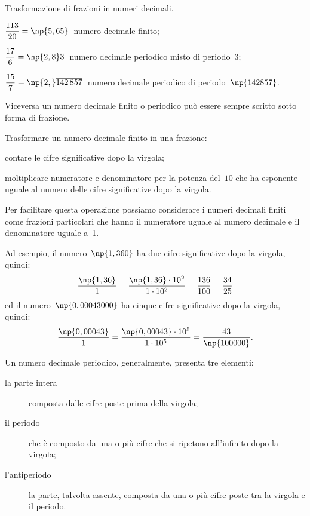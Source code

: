 \begin{exrig}
 \begin{esempio}
 Trasformazione di frazioni in numeri decimali.
  \begin{center}
  	
  \end{center}	
  \begin{enumeratea}
  \item $\dfrac{113}{20}=\np{5,65}\:$ numero decimale finito;\vspace{1.03ex}
  \item $\dfrac{17}{6}=\np{2,8}\overline{3}\:$ numero decimale periodico misto di periodo~3;\vspace{1.03ex}
  \item $\dfrac{15}{7}=\np{2,}\overline{142\,857}\:$ numero decimale periodico di periodo~$\np{142857}$.
  \end{enumeratea}
 \end{esempio}
\end{exrig}


\ovalbox{\risolvi \ref{ese:3.24}, \ref{ese:3.25}, \ref{ese:3.26}}\vspazio

Viceversa un numero decimale finito o periodico può essere sempre scritto sotto forma di frazione.

\begin{procedura}
	Trasformare un numero decimale finito in una frazione:
\begin{enumeratea}
 \item contare le cifre significative dopo la virgola;
 \item moltiplicare numeratore e denominatore per la potenza del~$10$ che ha esponente uguale al
	 numero delle cifre significative dopo la virgola.
\end{enumeratea}
\end{procedura}

Per facilitare questa operazione possiamo considerare i numeri decimali finiti come frazioni
particolari che hanno il numeratore uguale al numero decimale e il denominatore uguale a~1.

Ad esempio, il numero~$\np{1,360}$ ha due cifre significative dopo la virgola, quindi:
\[\frac{\np{1,36}}{1}=\frac{\np{1,36}\cdot10^2}{1\cdot10^2}=\frac{136}{100}=\frac{34}{25}\]
ed il numero~$\np{0,00043000}$ ha cinque cifre significative dopo la virgola, quindi:
\[\frac{\np{0,00043}}{1}=\frac{\np{0,00043}\cdot10^5}{1\cdot10^5}=\frac{43}{\np{100000}}.\]

Un numero decimale periodico, generalmente, presenta tre elementi:
\begin{description}
 \item [la parte intera] composta dalle cifre poste prima della virgola;
 \item [il periodo] che è composto da una o più cifre che si ripetono all'infinito dopo la virgola;
 \item [l'antiperiodo] la parte, talvolta assente, composta da una o più cifre poste tra la virgola e il periodo.
\end{description}


